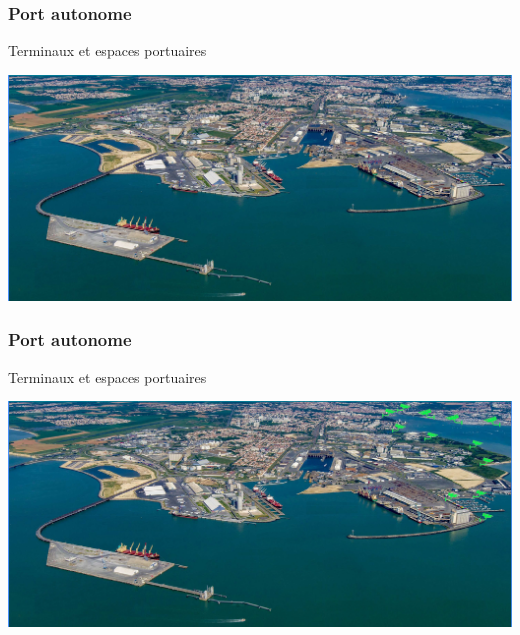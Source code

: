\begin{frame}
	\frametitle{Port autonome}
	Terminaux et espaces portuaires
	\vspace{0.2cm}
	\begin{center}
		\includegraphics[scale=0.35]{images/terminaux_et_espaces_portuaires1.jpg}
	\end{center}
\end{frame}
\begin{frame}
	\frametitle{Port autonome}
	Terminaux et espaces portuaires
	\vspace{0.2cm}
	\begin{center}
		\includegraphics[scale=0.35]{images/terminaux_et_espaces_portuaires0.jpg}
	\end{center}
\end{frame}
